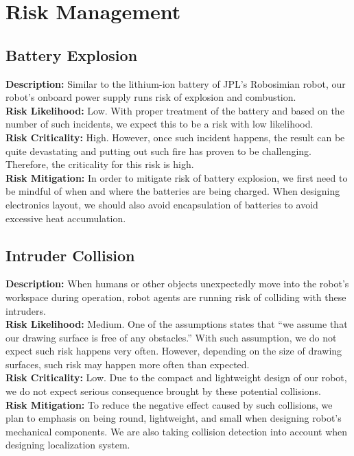 
\section{Risk Management}
\label{sec:risk}

\subsection{Battery Explosion}
\textbf{Description:} Similar to the lithium-ion battery of JPL’s Robosimian robot, our robot’s onboard power supply runs risk of explosion and combustion.\\
\textbf{Risk Likelihood:} Low. With proper treatment of the battery and based on the number of such incidents, we expect this to be a risk with low likelihood.\\
\textbf{Risk Criticality:} High. However, once such incident happens, the result can be quite devastating and putting out such fire has proven to be challenging. Therefore, the criticality for this risk is high.\\
\textbf{Risk Mitigation:} In order to mitigate risk of battery explosion, we first need to be mindful of when and where the batteries are being charged. When designing electronics layout, we should also avoid encapsulation of batteries to avoid excessive heat accumulation.\\

\subsection{Intruder Collision}
\textbf{Description:} When humans or other objects unexpectedly move into the robot’s workspace during operation, robot agents are running risk of colliding with these intruders.\\
\textbf{Risk Likelihood:} Medium. One of the assumptions states that “we assume that our drawing surface is free of any obstacles.” With such assumption, we do not expect such risk happens very often. However, depending on the size of drawing surfaces, such risk may happen more often than expected.\\
\textbf{Risk Criticality:} Low. Due to the compact and lightweight design of our robot, we do not expect serious consequence brought by these potential collisions.\\
\textbf{Risk Mitigation:} To reduce the negative effect caused by such collisions, we plan to emphasis on being round, lightweight, and small when designing robot’s mechanical components. We are also taking collision detection into account when designing localization system.\\

